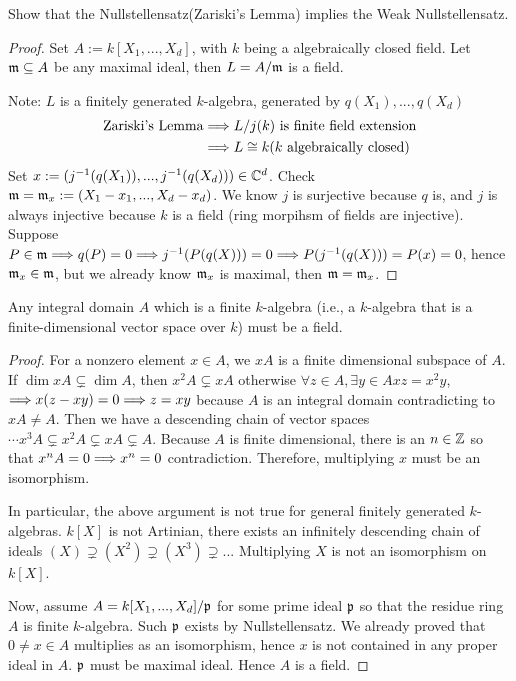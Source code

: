 \documentclass[11pt,fleqn]{book}
\begin{document}
\begin{exr}
Show that the Nullstellensatz(Zariski's Lemma) implies the Weak Nullstellensatz.
\end{exr}
\begin{proof} Set $A:=k[X_1,...,X_d]$, with $k$ being a algebraically closed field.
Let ${\mathfrak m}\subseteq {A}$ be any maximal ideal, then $ L={A}/{\mathfrak m}$ is a field.
\begin{center}
\end{center}
Note: $ L$ is a finitely generated $k$-algebra, generated by $q(X_1),...,q(X_d)$
$$
\begin{aligned}
\text{Zariski's Lemma}&\Longrightarrow  L/j(k)\text{ is finite field extension}\\
 & \Longrightarrow
 L\cong k \text{($k$ algebraically closed)}
\end{aligned}
$$
Set $x:=(j^{-1}(q(X_1)),...,j^{-1}(q(X_d)))\in \mathbb C^d$. Check ${\mathfrak m}={\mathfrak m}_x:=(X_1-x_1,...,X_d-x_d)$.
We know $j$ is surjective because $q$ is, and $j$ is always injective because $k$ is a field (ring morpihsm of fields are injective). Suppose $P\in {\mathfrak m}\Longrightarrow q(P)=0\Longrightarrow j^{-1}(P(q(X)))=0\Longrightarrow P(j^{-1}(q(X)))=P(x)=0$, hence ${\mathfrak m}_x\in {\mathfrak m}$, but we already know ${\mathfrak m}_x$ is maximal, then ${\mathfrak m}={\mathfrak m}_x$.
\end{proof}

\begin{exr}\label{exr:chap3_fin-dim_k_domain_is_field}
Any integral domain $A$ which is a finite $k$-algebra (i.e., a $k$-algebra that is a finite-dimensional vector space over $k$) must be a field. 
\end{exr}
\begin{proof}
For a nonzero element $x\in A$, we $xA$ is a finite dimensional subspace of $A$. If $\dim xA\subsetneq \dim A$, then $x^2A\subsetneq xA$ otherwise $\forall z\in A, \exists y \in A xz=x^2 y$, $\Longrightarrow x(z-xy)=0\Longrightarrow z=xy$ because $A$ is an integral domain contradicting to $xA\neq A$. Then we have a descending chain of vector spaces $\cdots x^3A\subsetneq x^2 A\subsetneq xA\subsetneq A$. Because $A$ is finite dimensional, there is an $n\in \mathbb Z$ so that $x^nA=0\Longrightarrow x^n=0$ contradiction. Therefore, multiplying $x$ must be an isomorphism.

In particular, the above argument is not true for general finitely generated $k$-algebras. $k[X]$ is not Artinian, there exists an infinitely descending chain of ideals $(X)\supsetneq (X^2)\supsetneq (X^3)\supsetneq ...$ Multiplying $X$ is not an isomorphism on $k[X]$.

Now, assume $A=k[X_1,...,X_d]/{\mathfrak p}$  for some prime ideal ${\mathfrak p}$ so that the residue ring $A$ is finite $k$-algebra. Such ${\mathfrak p}$ exists by Nullstellensatz. We already proved that $0\neq x\in A$ multiplies as an isomorphism, hence $x$ is not contained in any proper ideal in $A$. ${\mathfrak p}$ must be maximal ideal. Hence $A$ is a field.
\end{proof}
\end{document}
